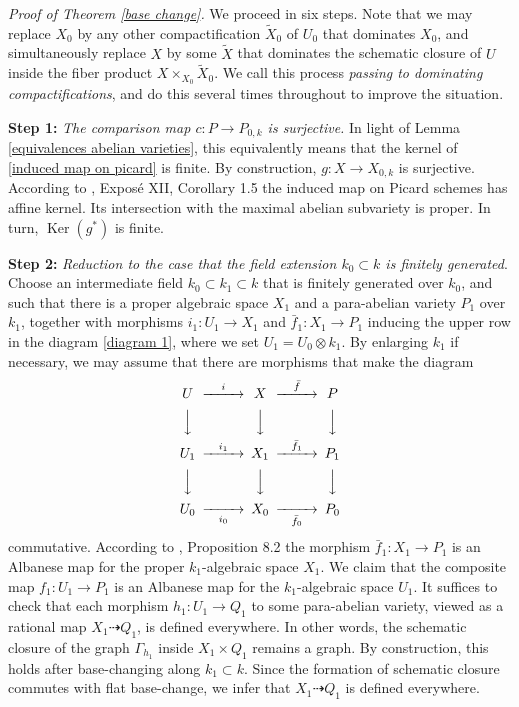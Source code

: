 \documentclass[oneside, 12pt]{amsart}
\theoremstyle{definition}
\theoremstyle{remark}
\newcommand{\Kernel}{\operatorname{Ker}}
\newcommand{\ra}{\rightarrow}
\newcommand{\baf}{\bar{f}}
\begin{document}
\medskip
\emph{Proof of Theorem \ref{base change}.} We proceed in six   steps. Note that we may replace $X_0$ by any other compactification  $\tilde{X}_0$ of $U_0$
that dominates $X_0$, and simultaneously replace $X$ by some $\tilde{X}$ that dominates
the schematic closure of $U$ inside the fiber product $X\times_{X_0}\tilde{X}_0$.
We call this process \emph{passing to dominating compactifications}, and do this several times throughout to improve the situation.

\medskip
{\bf Step 1:}
\emph{The comparison map $c:P\ra P_{0,k}$ is surjective.} In light of Lemma \ref{equivalences abelian varieties}, this equivalently means that
the kernel of \eqref{induced map on picard}  is finite.
By construction, $g:X\ra X_{0,k}$ is surjective.
According to \cite{SGA 6}, Expos\'e XII, Corollary 1.5 the induced map  on Picard schemes has affine kernel.
Its intersection with the maximal abelian subvariety is    proper.
In turn, $\Kernel(g^*)$ is finite.  

\medskip
{\bf Step 2:}
\emph{Reduction   to the case that the field extension $k_0\subset k$ is finitely generated}.
Choose an intermediate field $k_0\subset k_1\subset k$ that is finitely generated over $k_0$,
and such that there is a proper  algebraic space $X_1$ and a  para-abelian variety $P_1$ over $k_1$, together with 
 morphisms $i_1:U_1\ra X_1$ and $\baf_1:X_1\ra P_1$
inducing the upper row in the diagram \eqref{diagram 1}, where we set $U_1=U_0\otimes k_1$.
By enlarging $k_1$ if necessary, we may assume that there are  morphisms that make the diagram 
\begin{equation}
\label{diagram 1}
\begin{CD}
U	@>i>>	X	@>\bar{f}>>		P\\
@VVV		@VVV			@VVV\\
U_1	@>i_1>>	X_1	@>\bar{f}_1>>	P_1\\
@VVV		@VVV			@VVV\\
U_0	@>>i_0>	X_0	@>>\bar{f}_0>	P_0
\end{CD}
\end{equation}
commutative.   According to \cite{Laurent; Schroeer 2021}, Proposition 8.2 the morphism 
$\baf_1:X_1\ra P_1$ is an Albanese map for the proper $k_1$-algebraic space $X_1$. 
We claim that the composite map $f_1:U_1\ra P_1$ is an Albanese map for the   $k_1$-algebraic space $U_1$.  It suffices to check that
each morphism $h_1:U_1\ra Q_1$ to some para-abelian variety, viewed as a rational map $X_1\dashrightarrow Q_1$,
is defined everywhere. In other words, the schematic closure of the  graph $\Gamma_{h_1}$ inside $X_1\times Q_1$
remains a graph. 
 By construction, this holds after base-changing along $k_1\subset k$. Since the formation of schematic closure
commutes with flat base-change, we     infer that $X_1\dashrightarrow Q_1$ is defined everywhere.
\end{document}

